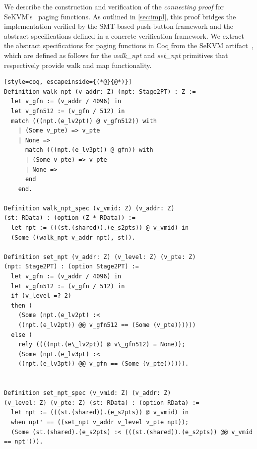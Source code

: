 We describe the construction and verification of the \textit{connecting proof} for SeKVM’s~\cite{li:ieeesp2021} paging functions. As outlined in \autoref{sec:impl}, this proof bridges the implementation verified by the SMT-based push-button framework and the abstract specifications defined in a concrete verification framework. We extract the abstract specifications for paging functions in Coq from the SeKVM artifact~\cite{spoq-artifact}, which are defined as follows for the \textit{walk\_npt} and \textit{set\_npt} primitives that respectively provide walk and map functionality.

\begin{lstlisting}[style=coq, escapeinside={(*@}{@*)}]
Definition walk_npt (v_addr: Z) (npt: Stage2PT) : Z :=
  let v_gfn := (v_addr / 4096) in
  let v_gfn512 := (v_gfn / 512) in
  match (((npt.(e_lv2pt)) @ v_gfn512)) with
    | (Some v_pte) => v_pte
    | None =>
      match (((npt.(e_lv3pt)) @ gfn)) with
      | (Some v_pte) => v_pte
      | None =>
      end
    end.

Definition walk_npt_spec (v_vmid: Z) (v_addr: Z)
(st: RData) : (option (Z * RData)) :=
  let npt := (((st.(shared)).(e_s2pts)) @ v_vmid) in
  (Some ((walk_npt v_addr npt), st)).

Definition set_npt (v_addr: Z) (v_level: Z) (v_pte: Z)
(npt: Stage2PT) : (option Stage2PT) :=
  let v_gfn := (v_addr / 4096) in
  let v_gfn512 := (v_gfn / 512) in
  if (v_level =? 2)
  then (
    (Some (npt.(e_lv2pt) :< 
    ((npt.(e_lv2pt)) @@ v_gfn512 == (Some (v_pte))))))
  else (
    rely ((((npt.(e\_lv2pt)) @ v\_gfn512) = None));
    (Some (npt.(e_lv3pt) :< 
    ((npt.(e_lv3pt)) @@ v_gfn == (Some (v_pte)))))).


Definition set_npt_spec (v_vmid: Z) (v_addr: Z)
(v_level: Z) (v_pte: Z) (st: RData) : (option RData) :=
  let npt := (((st.(shared)).(e_s2pts)) @ v_vmid) in
  when npt' == ((set_npt v_addr v_level v_pte npt));
  (Some (st.(shared).(e_s2pts) :< (((st.(shared)).(e_s2pts)) @@ v_vmid == npt'))).
  
\end{lstlisting}

